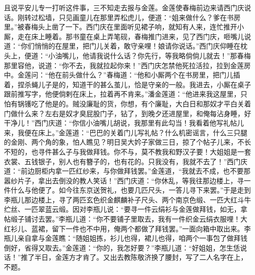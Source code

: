 且说平安儿专一打听这件事，三不知走去报与金莲。金莲使春梅前边来请西门庆说话。刚转过松墙，只见画童儿在那里弄松虎儿，便道：“姐来做什么？爹在书房里。”被春梅头上凿了一下。西门庆在里面听见裙子响，就知有人来，连忙推开小厮，走在床上睡着。那书童在桌上弄笔砚，春梅推门进来，见了西门庆，咂嘴儿说道：“你们悄悄的在屋里，把门儿关着，敢守亲哩！娘请你说话。”西门庆仰睡在枕头上，便道：“小油嘴儿，他请我说什么话？你先行，等我略倘倘儿就去！”那春梅那里容他，说道：“你不去，我就拉起你来！”西门庆怎禁他死拉活拉，拉到金莲房中。金莲问：“他在前头做什么？”春梅道：“他和小厮两个在书房里，把门儿插着，捏杀蝇儿子是的，知道干的甚么茧儿，恰是守亲的一般。我进去，小厮在桌子跟前推写字，他便倘剌在床上，拉着再不肯来。”潘金莲道：“他进来我这屋里，只怕有锅镬吃了他是的。贼没廉耻的货，你想，有个廉耻，大白日和那奴才平白关着门做什么来？左右是奴才臭屁股门子，钻了，到晚夕还进屋里，和俺每沾身睡，好干净儿！”西门庆道：“你信小油嘴儿胡说，我那里有此勾当！我看着他写礼帖儿来，我便\textShouWai 在床上。”金莲道：“巴巴的关着门儿写礼帖？什么机密谣言，什么三只腿的金刚、两个\textJiaoJing 角的象，怕人瞧见？明日吴大妗子家做三日，掠了个帖子儿来，不长不短的，也寻件甚么子与我做拜钱。你不与，莫不教我和野汉子要！大姐姐是一套衣裳、五钱银子，别人也有簪子的，也有花的。只我没有，我就不去了！”西门庆道：“前边厨柜内拿一匹红纱来，与你做拜钱罢。”金莲道，“我就去不成，也不要那嚣纱片子，拿出去倒没的教人笑话！”西门庆道：“你休乱，等我往那边楼上，寻一件什么与他便了。如今往东京送贺礼，也要几匹尺头，一答儿寻下来罢。”于是走到李瓶儿那边楼上，寻了两匹玄色织金麒麟补子尺头、两个南京色缎、一匹大红斗牛纻丝、一匹翠蓝云缎。因对李瓶儿说：“要寻一件云绢衫与金莲做拜钱，如无，拿帖缎子铺讨去罢。”李瓶儿道：“你不要铺子里取去，我有一件织金云绢衣服哩！大红衫儿、蓝裙，留下一件也不中用，俺两个都做了拜钱罢。”一面向箱中取出来。李瓶儿亲自拿与金莲瞧：“随姐姐拣，衫儿也得，裙儿也得，咱两个一事包了做拜钱倒好，省得又取去。”金莲道：“你的，我怎好要？”李瓶儿道：“好姐姐，怎生恁说话！”推了半日，金莲方才肯了。又出去教陈敬济换了腰封，写了二人名字在上，不题。

